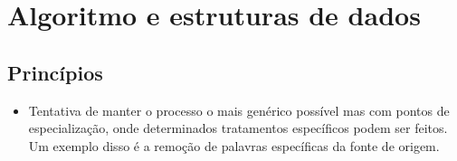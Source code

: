 \section{Algoritmo e estruturas de dados}

\subsection{Princípios}

\begin{itemize}
    \item Tentativa de manter o processo o mais genérico possível mas com pontos de especialização, onde determinados tratamentos específicos podem ser 
    feitos. Um exemplo disso é a remoção de palavras específicas da fonte de origem.
\end{itemize}